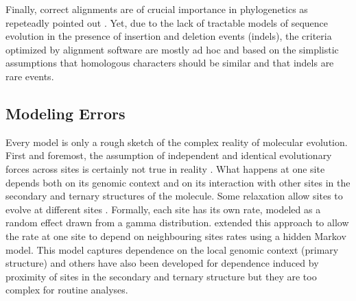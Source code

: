 
Finally, correct alignments are of crucial importance in phylogenetics as repeteadly pointed out \citep{morrison1997effects,ogden2006multiple,talavera2007improvement,wong2008alignment}. Yet, due to the lack of tractable models of sequence evolution in the presence of insertion and deletion events (indels), the criteria optimized by alignment software are mostly ad hoc  and based on the simplistic assumptions that homologous characters should be similar and that indels are rare events.


\subsection{Modeling Errors} \label{sec:modeling-errors}
%
Every model is only a rough sketch of the complex reality of molecular evolution. First and foremost, the assumption of independent and identical evolutionary forces across sites is certainly not true in reality \citep{Bird1986}. What happens at one site depends both on its genomic context and on its interaction with other sites in the secondary and ternary structures of the molecule. Some relaxation allow sites to evolve at different sites \citep{goldman1994codon}. Formally, each site has its own rate, modeled as a random effect drawn from a gamma distribution. \citet{felsenstein1996hidden} extended this approach to allow the rate at one site to depend on neighbouring sites rates using a hidden Markov model. This model captures dependence on the local genomic context (primary structure) and others have also been developed for dependence induced by proximity of sites in the secondary and ternary structure \citep{Robinson2003, Yu2006} but they are too complex for routine analyses. 

